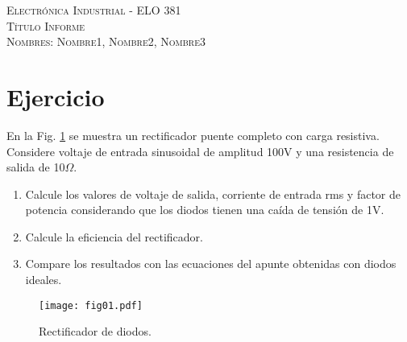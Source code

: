 \documentclass[letterpaper, 11pt]{article}
\begin{document}
\begin{center}
\noindent\makebox[\linewidth]{\rule{\textwidth}{0.4pt}}
\vspace{0.2cm}
\textsc{Electrónica Industrial - ELO 381}\\
\vspace{0.2cm}
\huge{\textsc{Título Informe}}\\
\vspace{0.6cm}
\normalsize{\textsc{Nombres: Nombre1, Nombre2, Nombre3 }}\\
\vspace{-0.2cm}
\noindent\makebox[\linewidth]{\rule{\textwidth}{0.4pt}}
\end{center}



\section*{Ejercicio}
En la Fig. \ref{fig:fig01} se muestra un rectificador puente completo con carga resistiva. Considere voltaje de entrada sinusoidal de amplitud 100V y una resistencia de salida de 10$\Omega$.
\begin{enumerate}\setlength{\itemsep}{3pt}
\item Calcule los valores de voltaje de salida, corriente de entrada rms y factor de potencia considerando que los diodos tienen una caída de tensión de 1V.
\item Calcule la eficiencia del rectificador. 
\item Compare los resultados con las ecuaciones del apunte obtenidas con diodos ideales.
\end{enumerate}

\begin{figure}[!ht]
\centering
\texttt{[image: fig01.pdf]}
\caption{Rectificador de diodos.}
\label{fig:fig01}
\end{figure}
\end{document}
